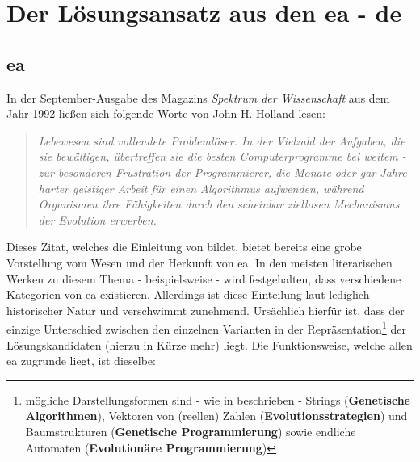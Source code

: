 \chapter{Der Lösungsansatz aus den \gls{ea} - \gls{de}}
\label{sec:ex}

	\section{\gls{ea}}
	\label{sec:evol}
	
	In der September-Ausgabe des Magazins \textit{Spektrum der Wissenschaft} \cite{j-h-holland} aus dem Jahr 1992 ließen sich folgende Worte von John H. Holland lesen: \\
	
	\begin{quote}
		\textit{Lebewesen sind vollendete Problemlöser. In der Vielzahl der Aufgaben, die sie bewältigen, übertreffen sie die besten Computerprogramme bei weitem - zur besonderen Frustration der Programmierer, die Monate oder gar Jahre harter geistiger Arbeit für einen Algorithmus aufwenden, während Organismen ihre Fähigkeiten durch den scheinbar ziellosen Mechanismus der Evolution erwerben. \\}
	\end{quote}
	
	Dieses Zitat, welches die Einleitung von \cite{ger-kla-kru-intro} bildet, bietet bereits eine grobe Vorstellung vom Wesen und der Herkunft von \gls{ea}. In den meisten literarischen Werken zu diesem Thema - beispielsweise \cite{ger-kla-kru-intro, eib-smi-ea} - wird festgehalten, dass verschiedene Kategorien von \gls{ea} existieren. Allerdings ist diese Einteilung laut \cite{eib-smi-ea} lediglich historischer Natur und verschwimmt zunehmend. Ursächlich hierfür ist, dass der einzige Unterschied zwischen den einzelnen Varianten in der Repräsentation\footnote{mögliche Darstellungsformen sind - wie in \cite{eib-smi-ea} beschrieben - Strings (\textbf{Genetische Algorithmen}), Vektoren von (reellen) Zahlen (\textbf{Evolutionsstrategien}) und Baumstrukturen (\textbf{Genetische Programmierung}) sowie endliche Automaten (\textbf{Evolutionäre Programmierung})} der Lösungskandidaten (hierzu in Kürze mehr) liegt. Die Funktionsweise, welche allen \gls{ea} zugrunde liegt, ist dieselbe: \\
	
